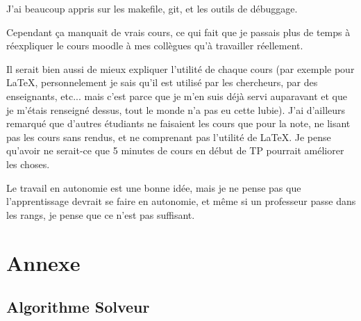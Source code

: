 \documentclass[12pt]{article}
\begin{document}
J'ai beaucoup appris sur les makefile, git, et les outils de débuggage.

Cependant ça manquait de vrais cours, ce qui fait que je passais plus de temps à réexpliquer le cours moodle à mes collègues qu'à travailler réellement.

Il serait bien aussi de mieux expliquer l'utilité de chaque cours (par exemple pour \LaTeX, personnelement je sais qu'il est utilisé par les chercheurs, par des enseignants, etc... mais c'est parce que je m'en suis déjà servi auparavant et que je m'étais renseigné dessus, tout le monde n'a pas eu cette lubie). 
J'ai d'ailleurs remarqué que d'autres étudiants ne faisaient les cours que pour la note, ne lisant pas les cours sans rendus, et ne comprenant pas l'utilité de \LaTeX.
Je pense qu'avoir ne serait-ce que 5 minutes de cours en début de TP pourrait améliorer les choses.

Le travail en autonomie est une bonne idée, mais je ne pense pas que l'apprentissage devrait se faire en autonomie, et même si un professeur passe dans les rangs, je pense que ce n'est pas suffisant.

\section{Annexe}
\subsection{Algorithme Solveur}
\label{algosolv}

\end{document}
